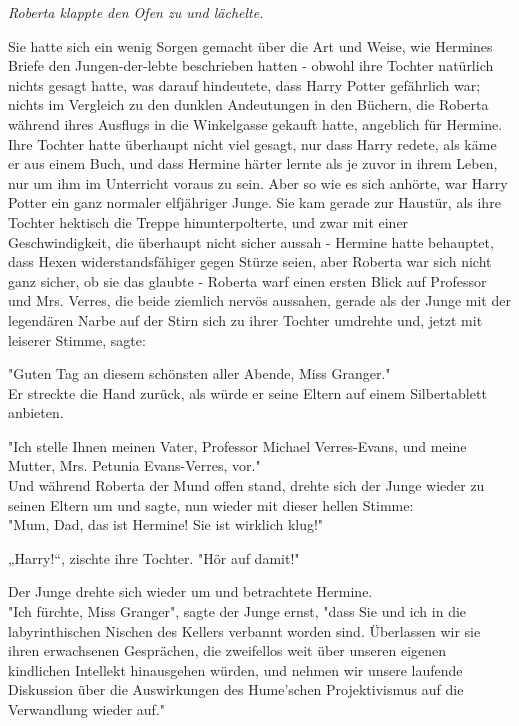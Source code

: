 {\emph{Roberta klappte den Ofen zu und lächelte.}

Sie hatte sich ein wenig Sorgen gemacht über die Art und Weise, wie Hermines Briefe den Jungen-der-lebte beschrieben hatten - obwohl ihre Tochter natürlich nichts gesagt hatte, was darauf hindeutete, dass Harry Potter gefährlich war; nichts im Vergleich zu den dunklen Andeutungen in den Büchern, die Roberta während ihres Ausflugs in die Winkelgasse gekauft hatte, angeblich für Hermine. Ihre Tochter hatte überhaupt nicht viel gesagt, nur dass Harry redete, als käme er aus einem Buch, und dass Hermine härter lernte als je zuvor in ihrem Leben, nur um ihm im Unterricht voraus zu sein. Aber so wie es sich anhörte, war Harry Potter ein ganz normaler elfjähriger Junge. Sie kam gerade zur Haustür, als ihre Tochter hektisch die Treppe hinunterpolterte, und zwar mit einer Geschwindigkeit, die überhaupt nicht sicher aussah - Hermine hatte behauptet, dass Hexen widerstandsfähiger gegen Stürze seien, aber Roberta war sich nicht ganz sicher, ob sie das glaubte - Roberta warf einen ersten Blick auf Professor und Mrs. Verres, die beide ziemlich nervös aussahen, gerade als der Junge mit der legendären Narbe auf der Stirn sich zu ihrer Tochter umdrehte und, jetzt mit leiserer Stimme, sagte:

"Guten Tag an diesem schönsten aller Abende, Miss Granger."\\ Er streckte die Hand zurück, als würde er seine Eltern auf einem Silbertablett anbieten.

"Ich stelle Ihnen meinen Vater, Professor Michael Verres-Evans, und meine Mutter, Mrs. Petunia Evans-Verres, vor."\\ Und während Roberta der Mund offen stand, drehte sich der Junge wieder zu seinen Eltern um und sagte, nun wieder mit dieser hellen Stimme:\\ "Mum, Dad, das ist Hermine! Sie ist wirklich klug!"

„Harry!“, zischte ihre Tochter. "Hör auf damit!"

Der Junge drehte sich wieder um und betrachtete Hermine.\\ "Ich fürchte, Miss Granger", sagte der Junge ernst, "dass Sie und ich in die labyrinthischen Nischen des Kellers verbannt worden sind. Überlassen wir sie ihren erwachsenen Gesprächen, die zweifellos weit über unseren eigenen kindlichen Intellekt hinausgehen würden, und nehmen wir unsere laufende Diskussion über die Auswirkungen des Hume'schen Projektivismus auf die Verwandlung wieder auf."

}
